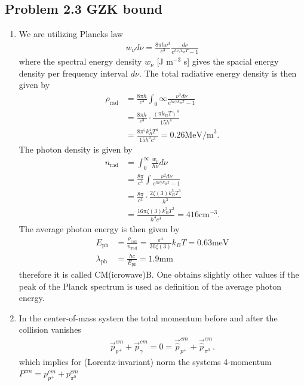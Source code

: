 \documentclass[10pt,a4paper]{book}
\theoremstyle{definition}
\begin{document}
\subsection{Problem 2.3 GZK bound}
\begin{enumerate}
    \item We are utilizing Plancks law
    \begin{align}
        w_\nu d\nu = \frac{8\pi h\nu^3}{c^3}\frac{d\nu}{e^{h\nu/k_BT}-1}
    \end{align}
    where the spectral energy density $w_\nu$ [J m$^{-3}$ s] gives the spacial energy density per frequency interval $d\nu$. The total radiative energy density is then given by
    \begin{align}
        \rho_\text{rad} &= \frac{8\pi h}{c^3}\int_0\infty \frac{\nu^3d\nu}{e^{h\nu/k_BT}-1}\\
        &=\frac{8\pi h}{c^3}\cdot\frac{(\pi k_B T)^4}{15h^4}\\
        &=\frac{8\pi^5k_B^4 T^4}{15h^3 c^3}=0.26\text{MeV/m}^3.
    \end{align}
    The photon density is given by
    \begin{align}
        n_\text{rad} &=\int_0^\infty\frac{w_\nu}{h\nu}d\nu\\
        &= \frac{8\pi}{c^3}\int \frac{\nu^2d\nu}{e^{h\nu/k_BT}-1}\\
        &=\frac{8\pi}{c^3}\cdot\frac{2\zeta(3) k_B^3 T^3}{h^3}\\
        &=\frac{16\pi\zeta(3) k_B^3 T^3}{h^3c^3}=416\text{cm}^{-3}.
    \end{align}
    The average photon energy is then given by
    \begin{align}
        E_\text{ph}&=\frac{\rho_\text{rad}}{n_\text{rad}}=\frac{\pi^4}{30\zeta(3)}k_BT=0.63\text{meV}\\
        \lambda_\text{ph}&=\frac{hc}{E_\text{ph}}=1.9\text{mm}
    \end{align}
    therefore it is called CM(icrowave)B.
    One obtains slightly other values if the peak of the Planck spectrum is used as definition of the average photon energy.
    \item In the center-of-mass system the total momentum before and after the collision vanishes
    \begin{align}
        \vec{p}_{p^+}^{cm}+\vec{p}_\gamma^{cm}=0=\vec{\hat{p}}_{p^+}^{cm}+\vec{\hat{p}}_{\pi^0}^{cm}.
    \end{align}
    which implies for (Lorentz-invariant) norm the systems 4-momentum $P^{cm}=p_{p^+}^{cm}+p_{\pi^0}^{cm}$

\end{enumerate}
\end{document}
